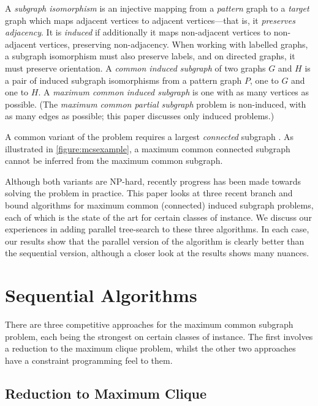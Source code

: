 \documentclass[sigconf]{acmart}
\begin{document}
A \emph{subgraph isomorphism} is an injective mapping from a \emph{pattern} graph to a \emph{target}
graph which maps adjacent vertices to adjacent vertices---that is, it \emph{preserves adjacency}. It
is \emph{induced} if additionally it maps non-adjacent vertices to non-adjacent vertices, preserving
non-adjacency. When working with labelled graphs, a subgraph isomorphism must also preserve labels, and
on directed graphs, it must preserve orientation. A \emph{common induced subgraph} of two graphs $G$
and $H$ is a pair of induced subgraph isomorphisms from a pattern graph $P$, one to $G$ and one to
$H$. A \emph{maximum common induced subgraph} is one with as many vertices as possible. (The
\emph{maximum common partial subgraph} problem is non-induced, with as many edges as
possible; this paper discusses only induced problems.)

 A common variant of the problem requires a largest \emph{connected} subgraph
 \citep{DBLP:journals/jcamd/RaymondW02a,DBLP:conf/mco/VismaraV08,o:EhrlichR11,o:LuoWSN17}.  As
 illustrated in \cref{figure:mcsexample}, a maximum common connected subgraph cannot be inferred
 from the maximum common subgraph.

Although both variants are NP-hard, recently progress has been made towards solving the problem in
practice.  This paper looks at three recent branch and bound algorithms for maximum common
(connected) induced subgraph problems, each of which is the state of the art for certain classes of
instance. We discuss our experiences in adding parallel tree-search to these three algorithms. In
each case, our results show that the parallel version of the algorithm is clearly better than the
sequential version, although a closer look at the results shows many nuances.

\section{Sequential Algorithms}

There are three competitive approaches for the maximum common subgraph problem, each being the
strongest on certain classes of instance. The first involves a reduction to the maximum clique
problem, whilst the other two approaches have a constraint programming feel to them.

\subsection{Reduction to Maximum Clique}
\end{document}
